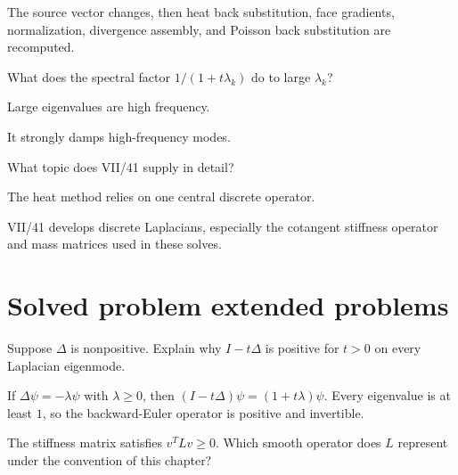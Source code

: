 \begin{solution}
The source vector changes, then heat back substitution, face gradients, normalization, divergence assembly, and Poisson back substitution are recomputed.
\end{solution}

\begin{exercise}\label{exr:vii40-23}
What does the spectral factor \(1/(1+t\lambda_k)\) do to large \(\lambda_k\)?
\end{exercise}

\begin{hint}
Large eigenvalues are high frequency.
\end{hint}

\begin{solution}
It strongly damps high-frequency modes.
\end{solution}

\begin{exercise}\label{exr:vii40-24}
What topic does VII/41 supply in detail?
\end{exercise}

\begin{hint}
The heat method relies on one central discrete operator.
\end{hint}

\begin{solution}
VII/41 develops discrete Laplacians, especially the cotangent stiffness operator and mass matrices used in these solves.
\end{solution}

\section{Solved problem extended problems}

\begin{problem}\label{prob:vii40-01}
Suppose \(\Delta\) is nonpositive.  Explain why \(I-t\Delta\) is positive for \(t>0\) on every Laplacian eigenmode.
\end{problem}

\begin{solution}
If \(\Delta\psi=-\lambda\psi\) with \(\lambda\ge0\), then \((I-t\Delta)\psi=(1+t\lambda)\psi\).  Every eigenvalue is at least \(1\), so the backward-Euler operator is positive and invertible.
\end{solution}

\begin{problem}\label{prob:vii40-02}
The stiffness matrix satisfies \(v^T L v\ge0\).  Which smooth operator does \(L\) represent under the convention of this chapter?
\end{problem}

